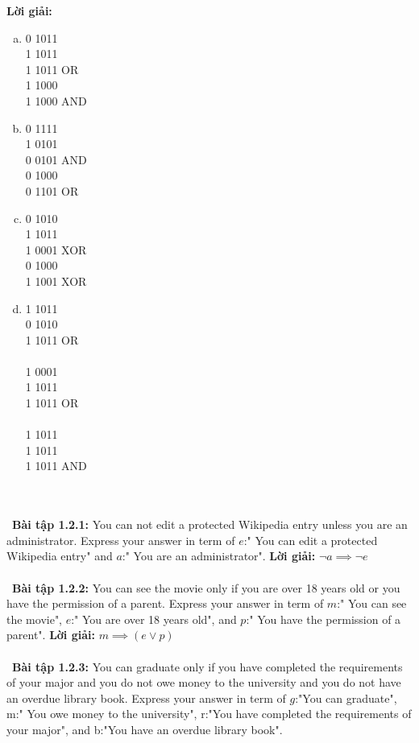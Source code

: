\documentclass[a4paper]{article}
\begin{document}
\textbf{Lời giải: } \begin{enumerate}[a)]
\item 0 1011\\1 1011\\
1 1011 OR\\ 1 1000\\1 1000 AND
\item 0 1111\\ 1 0101\\
0 0101 AND\\ 0 1000\\0 1101 OR
\item  0 1010\\1 1011\\
1 0001 XOR\\0 1000\\1 1001 XOR
\item 1 1011\\0 1010\\1 1011 OR\\\\
1 0001\\1 1011\\1 1011 OR\\\\
1 1011\\1 1011\\1 1011 AND
\end{enumerate}\\\ \\\
\textbf{Bài tập 1.2.1:}  You can not edit a protected Wikipedia entry unless you are an administrator. Express your answer in term of $e$:" You can edit a protected Wikipedia entry" and $a$:" You are an administrator".
\textbf{Lời giải: }  $\lnot a \implies \lnot e$
\\\ \\\
\textbf{Bài tập 1.2.2:} You can see the movie only if you are over 18 years old or you have the permission of a parent. Express your answer in term of $m$:" You can see the movie", $e$:" You are over 18 years old", and $p$:" You have the permission of a parent".
\textbf{Lời giải: } $m \implies (e \lor p)$ \\\ \\\
\textbf{Bài tập 1.2.3:} You can graduate only if you have completed the requirements of your major and you do not owe  money to the university and you do not have an overdue library book. Express your answer in term of $g$:"You can graduate", m:" You owe money to the university", r:"You have completed the requirements of your major", and b:"You have an overdue library book".
\end{document}
